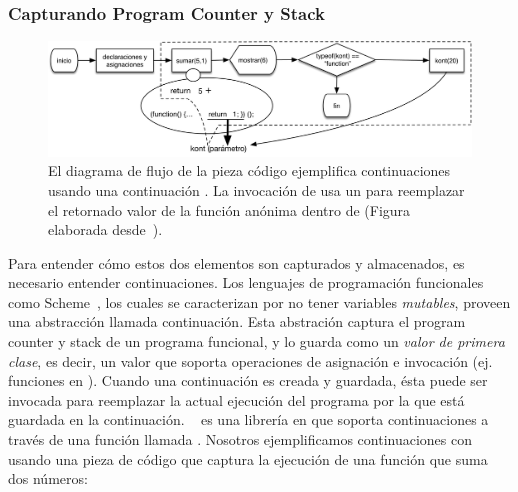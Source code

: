 \documentclass[conference]{IEEEtran}
\begin{document}
 \bigskip

\subsubsection{Capturando Program Counter y Stack}
\label{sec:continuaciones}

\begin{figure}[t]
\begin{center}
\includegraphics[width=.8\linewidth]{fig-kont}
\caption{El diagrama de flujo de la pieza c\'odigo ejemplifica continuaciones usando una continuaci\'on . La invocaci\'on de  usa un  para reemplazar el retornado valor de la funci\'on an\'onima dentro de  (Figura elaborada desde~\cite{legerFukuda:sac-se2017}).}  

\label{fig:kont}
\end{center}
\end{figure}


Para entender c\'omo estos dos elementos son capturados y almacenados, es necesario entender continuaciones. Los lenguajes de programaci\'on funcionales como Scheme~\cite{scheme48}, los cuales se caracterizan por no tener variables {\em mutables}, proveen una abstracci\'on llamada continuaci\'on. Esta abstraci\'on captura el program counter y stack de un programa funcional, y lo guarda como un {\em valor de primera clase}, es decir, un valor que soporta operaciones de asignaci\'on e invocaci\'on (ej. funciones en \javascript). Cuando una continuaci\'on es creada y guardada, \'esta puede ser invocada para reemplazar la actual ejecuci\'on del programa por la que est\'a guardada en la continuaci\'on. \unwinder~\cite{unwinder:2018} es una librer\'ia en \javascript que soporta continuaciones a trav\'es de una funci\'on llamada . Nosotros ejemplificamos continuaciones con \unwinder usando una pieza de c\'odigo que captura la ejecuci\'on de una funci\'on que suma dos n\'umeros:     
\end{document}
